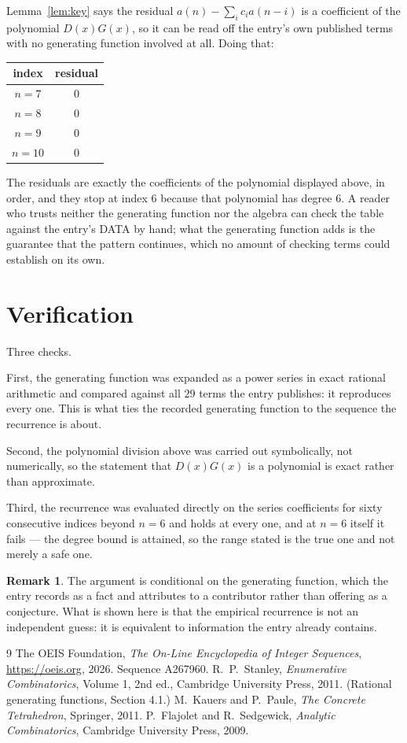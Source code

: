 \documentclass[11pt,a4paper]{article}
\theoremstyle{plain}
\theoremstyle{definition}
\newtheorem{remark}[theorem]{Remark}
\begin{document}
Lemma~\ref{lem:key} says the residual $a(n)-\sum_ic_ia(n-i)$ is a coefficient of the
polynomial $D(x)G(x)$, so it can be read off the entry's own published terms with no
generating function involved at all. Doing that:
\begin{center}
\begin{tabular}{cc}
index & residual \\ \hline
$n=7$ & $0$ \\
$n=8$ & $0$ \\
$n=9$ & $0$ \\
$n=10$ & $0$
\end{tabular}
\end{center}
The residuals are exactly the coefficients of the polynomial displayed above, in order, and
they stop at index $6$ because that polynomial has degree $6$. A reader who trusts
neither the generating function nor the algebra can check the table against the entry's DATA
by hand; what the generating function adds is the guarantee that the pattern continues, which
no amount of checking terms could establish on its own.

\section{Verification}

Three checks.

First, the generating function was expanded as a power series in exact rational arithmetic and
compared against all $29$ terms the entry publishes: it reproduces every one. This is
what ties the recorded generating function to the sequence the recurrence is about.

Second, the polynomial division above was carried out symbolically, not numerically, so the
statement that $D(x)G(x)$ is a polynomial is exact rather than approximate.

Third, the recurrence was evaluated directly on the series coefficients for sixty consecutive
indices beyond $n=6$ and holds at every one, and at $n=6$ itself it fails --- the
degree bound is attained, so the range stated is the true one and not merely a safe one.

\begin{remark}
The argument is conditional on the generating function, which the entry records as a fact and
attributes to a contributor rather than offering as a conjecture. What is shown here is that
the empirical recurrence is not an independent guess: it is equivalent to information the
entry already contains.
\end{remark}

\begin{thebibliography}{9}
 The OEIS Foundation, \emph{The On-Line Encyclopedia of Integer
Sequences}, \url{https://oeis.org}, 2026. Sequence A267960.
 R.~P.~Stanley, \emph{Enumerative Combinatorics}, Volume 1, 2nd ed.,
Cambridge University Press, 2011. (Rational generating functions, Section 4.1.)
 M.~Kauers and P.~Paule, \emph{The Concrete Tetrahedron}, Springer, 2011.
 P.~Flajolet and R.~Sedgewick, \emph{Analytic Combinatorics}, Cambridge
University Press, 2009.
\end{thebibliography}
\end{document}
